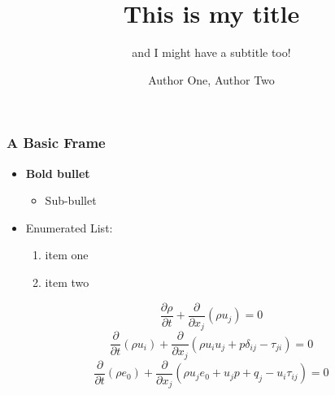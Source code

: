 \documentclass[aspectratio=1610]{beamer}
\begin{document}
\title{This is my title}
\subtitle{and I might have a subtitle too!}
\author{Author One, Author Two}
\begin{NCARtitleframe}%
  \vspace{6em}
  \maketitle
\end{NCARtitleframe}



\begin{frame}
  \frametitle{A Basic Frame}

  \begin{itemize}
  \item \textbf{Bold bullet}
    \begin{itemize}
    \item Sub-bullet
    \end{itemize}
  \item Enumerated List:
    \begin{enumerate}
    \item item one
    \item item two
    \end{enumerate}
  \end{itemize}
  \begin{equation}
    \frac{\partial \rho}{\partial t} +
    \frac{\partial}{\partial x_{j}} (\rho u_{j}) = 0
  \end{equation}
  \begin{equation}
    \frac{\partial}{\partial t} (\rho u_{i}) +
    \frac{\partial}{\partial x_{j}} (\rho u_{i} u_{j} + p \delta_{ij} - \tau_{ji} )
    = 0
  \end{equation}
  \begin{equation}
    \frac{\partial}{\partial t} ( \rho e_{0} ) +
    \frac{\partial}{\partial x_{j}}
    ( \rho u_{j} e_{0} + u_{j} p + q_{j} - u_{i} \tau_{ij} ) = 0
  \end{equation}
\end{frame}
\end{document}
